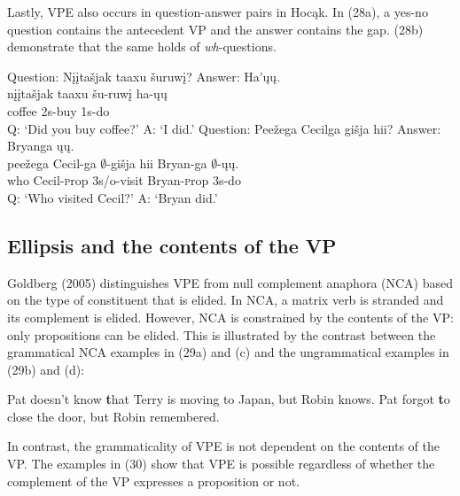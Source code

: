 \documentclass[output=paper]{LSP/langsci}
\begin{document}
Lastly, VPE also occurs in question-answer pairs in Hoc\k{a}k. In (28a), a yes-no question contains the antecedent VP and the answer contains the gap. (28b) demonstrate that the same holds of \emph{wh}-questions.

\begin{exe}
\ex
\begin{xlist}
\ex
\glll Question: {N\k{i}\k{i}ta\v{s}jak taaxu} \v{s}uruw\k{i}? Answer: Ha'\k{u}\k{u}.\\
{} {n\k{i}\k{i}ta\v{s}jak taaxu} \v{s}u-ruw\k{i} {} ha-\k{u}\k{u}\\
{} coffee {\textsc 2s}-buy {} {\textsc 1s}-do\\
 \trans Q: `Did you buy coffee?' A: `I did.'
\ex
\glll Question: Pee\v{z}ega Cecilga {gi\v{s}ja hii}? Answer: Bryanga \k{u}\k{u}.\\
{} pee\v{z}ega Cecil-ga $\emptyset$-{gi\v{s}ja hii} {} Bryan-ga $\emptyset$-\k{u}\k{u}.\\
{} who Cecil-{\textsc prop} {\textsc 3s/o}-visit {} Bryan-{\textsc prop} {\textsc 3s}-do\\
\trans Q: `Who visited Cecil?' A: `Bryan did.'
\end{xlist}
\end{exe}


\subsection{Ellipsis and the contents of the VP}

Goldberg (2005) distinguishes VPE from null complement anaphora (NCA) based on the type of constituent that is elided. In NCA, a matrix verb is stranded and its complement is elided. However, NCA is constrained by the contents of the VP: only propositions can be elided. This is illustrated by the contrast between the grammatical NCA examples in (29a) and (c) and the ungrammatical examples in (29b) and (d):

\begin{exe}
\ex
\begin{xlist}
\ex
Pat doesn't know {\textbf that Terry is moving to Japan}, but Robin knows.
\ex
Pat forgot {\textbf to close the door}, but Robin remembered.
\end{xlist}
\end{exe}

In contrast, the grammaticality of VPE is not dependent on the contents of the VP. The examples in (30) show that VPE is possible regardless of whether the complement of the VP expresses a proposition or not.
\end{document}
